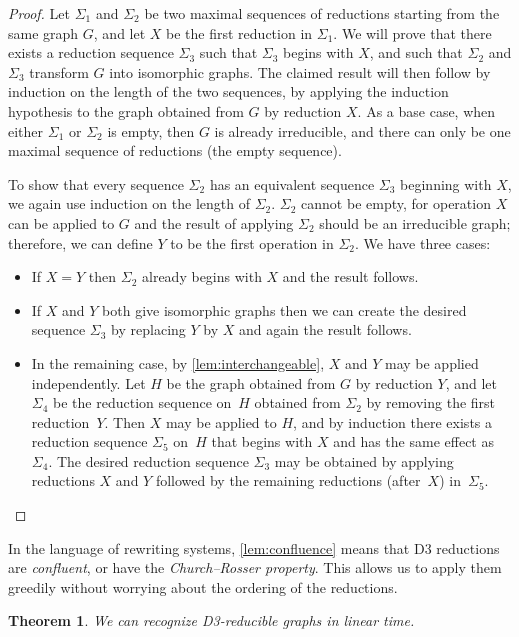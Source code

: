 \documentclass{article}
\newtheorem{theorem}{Theorem}
\begin{document}
\begin{proof}
Let $\Sigma_1$ and $\Sigma_2$ be two maximal sequences of reductions starting from the same graph $G$, and let $X$ be the first reduction in $\Sigma_1$. We will prove that there exists a reduction sequence $\Sigma_3$ such that $\Sigma_3$ begins with $X$, and such that $\Sigma_2$ and $\Sigma_3$ transform $G$ into isomorphic graphs. The claimed result will then follow by induction on the length of the two sequences,
by applying the induction hypothesis to the graph obtained from $G$ by reduction $X$. As a base case, when either $\Sigma_1$ or $\Sigma_2$ is empty, then $G$ is already irreducible, and there can only be one maximal sequence of reductions (the empty sequence).

To show that every sequence $\Sigma_2$ has an equivalent sequence $\Sigma_3$ beginning with $X$, we again use induction on the length of $\Sigma_2$. $\Sigma_2$ cannot be empty, for operation $X$ can be applied to $G$ and the result of applying $\Sigma_2$ should be an irreducible graph; therefore, we can define $Y$ to be the first operation in $\Sigma_2$. We have three cases:
\begin{itemize}
\item If $X=Y$ then $\Sigma_2$ already begins with $X$ and the result follows.
\item If $X$ and $Y$ both give isomorphic graphs then we can create the desired sequence $\Sigma_3$ by replacing $Y$ by $X$ and again the result follows.
\item In the remaining case, by \autoref{lem:interchangeable}, $X$ and $Y$ may be applied independently. Let $H$ be the graph obtained from $G$ by reduction $Y$, and let $\Sigma_4$ be the reduction sequence on~$H$ obtained from $\Sigma_2$ by removing the first reduction~$Y$.
Then $X$ may be applied to $H$, and by induction there exists a reduction sequence $\Sigma_5$ on~$H$ that begins with $X$ and has the same effect as $\Sigma_4$. The desired reduction sequence $\Sigma_3$ may be obtained by applying reductions $X$ and $Y$ followed by the remaining reductions (after~$X$) in~$\Sigma_5$.\qedhere
\end{itemize}
\end{proof}

In the language of rewriting systems, \autoref{lem:confluence} means that D3 reductions are \emph{confluent}, or have the \emph{Church--Rosser property}. This allows us to apply them greedily without worrying about the ordering of the reductions.

\begin{theorem}
We can recognize D3-reducible graphs in linear time.
\end{theorem}
\end{document}
